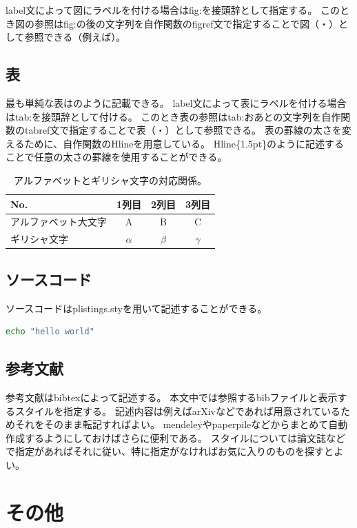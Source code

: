 \documentclass[uplatex]{jsarticle}
\begin{document}
\par
label文によって図にラベルを付ける場合はfig:を接頭辞として指定する。
このとき図の参照はfig:の後の文字列を自作関数のfigref文で指定することで図（・）として参照できる（例えば）。

\subsection{表}

最も単純な表はのように記載できる。
label文によって表にラベルを付ける場合はtab:を接頭辞として付ける。
このとき表の参照はtab:おあとの文字列を自作関数のtabref文で指定することで表（・）として参照できる。
表の罫線の太さを変えるために、自作関数のHlineを用意している。
Hline\{1.5pt\}のように記述することで任意の太さの罫線を使用することができる。
\begin{table}[H]
	\centering
	\caption{アルファベットとギリシャ文字の対応関係。}
	\label{tab:abc}
	\begin{tabular}{lccc}
		\Hline{1.5pt}
		No. & 1列目 & 2列目 & 3列目 \\
		\hline
		アルファベット大文字 & A & B & C \\
		ギリシャ文字 & $\alpha$ & $\beta$ & $\gamma$ \\
		\hline
	\end{tabular}
\end{table}



\subsection{ソースコード}
ソースコードはplistings.styを用いて記述することができる。
\begin{lstlisting}[language=sh, caption=hello world]
echo "hello world"
\end{lstlisting}

\subsection{参考文献}
参考文献はbibtexによって記述する。
本文中では参照するbibファイルと表示するスタイルを指定する。
記述内容は例えばarXivなどであれば用意されているためそれをそのまま転記すればよい。
mendeleyやpaperpileなどからまとめて自動作成するようにしておけばさらに便利である。
スタイルについては論文誌などで指定があればそれに従い、特に指定がなければお気に入りのものを探すとよい。


\section{その他}
\end{document}

